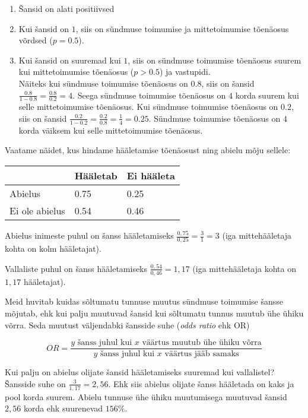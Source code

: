 \documentclass[
]{book}
\providecommand{\tightlist}{%
  \setlength{\itemsep}{0pt}\setlength{\parskip}{0pt}}
\begin{document}
\begin{enumerate}
\def\labelenumi{\arabic{enumi}.}
\tightlist
\item
  Šansid on alati positiivsed\\
\item
  Kui šansid on \(1\), siis on sündmuse toimumise ja mittetoimumise tõenäosus võrdsed (\(p=0.5\)).\\
\item
  Kui šansid on suuremad kui \(1\), siis on sündmuse toimumise tõenäosus suurem kui mittetoimumise tõenäosus (\(p>0.5\)) ja vastupidi.\\
  Näiteks kui sündmuse toimumise tõenäosus on \(0.8\), siis on šansid \(\frac{0.8}{1-0.8}=\frac{0.8}{0.2}=4\). Seega sündmuse toimumise tõenäosus on \(4\) korda suurem kui selle mittetoimumise tõenäosus. Kui sündmuse toimumise tõenäosus on \(0.2\), siis on šansid \(\frac{0.2}{1-0.2}=\frac{0.2}{0.8}=\frac{1}{4}=0.25\). Sündmuse toimumise tõenäosus on \(4\) korda väiksem kui selle mittetoimumise tõenäosus.
\end{enumerate}

Vaatame näidet, kus hindame hääletamise tõenäosust ning abielu mõju sellele:

\begin{longtable}[]{@{}lll@{}}
\toprule
& Hääletab & Ei hääleta \\
\midrule
\endhead
Abielus & 0.75 & 0.25 \\
Ei ole abielus & 0.54 & 0.46 \\
\bottomrule
\end{longtable}

Abielus inimeste puhul on šanss hääletamiseks \(\frac{0,75}{0,25} = \frac{3}{1}= 3\) (iga mittehääletaja kohta on kolm hääletajat).

Vallaliste puhul on šanss hääletamiseks \(\frac{0,54}{0,46} = 1,17\) (iga mittehääletaja kohta on \(1,17\) hääletajat).

Meid huvitab kuidas sõltumatu tunnuse muutus sündmuse toimumise šansse mõjutab, ehk kui palju muutuvad šansid kui sõltumatu tunnus muutub ühe ühiku võrra. Seda muutust väljendabki šansside suhe (\emph{odds ratio} ehk OR)

\[OR=\frac{y \text{ šanss juhul kui } x \text{ väärtus muutub ühe ühiku võrra}}{y \text{ šanss juhul kui } x \text{ väärtus jääb samaks}}\]

Kui palju on abielus olijate šansid hääletamiseks suuremad kui vallalistel? Šansside suhe on \(\frac{3}{1,17}=2,56\). Ehk siis abielus olijate šanss hääletada on kaks ja pool korda suurem. Abielu tunnuse ühe ühiku muutumisega muutuvad šansid \(2,56\) korda ehk suurenevad \(156\%\).
\end{document}
